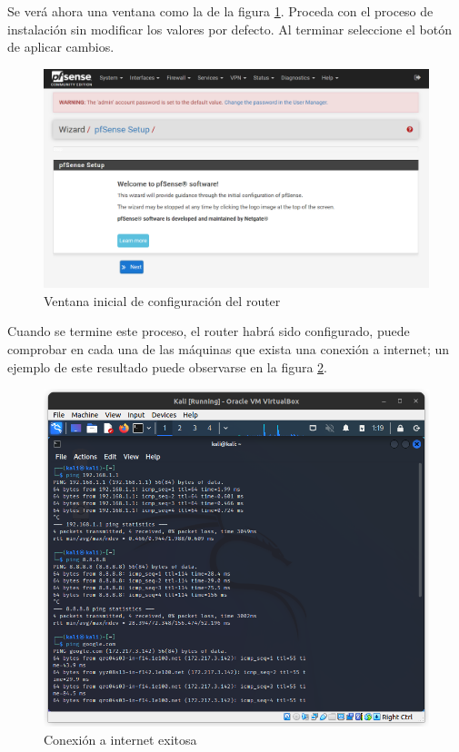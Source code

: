 \documentclass{article}
\begin{document}
            Se verá ahora una ventana como la de la figura \ref{fig:pfsense-config-init}. Proceda con el proceso de instalación sin modificar los valores por defecto. Al terminar seleccione el botón de aplicar cambios.
            \begin{figure}[!htbp]
                \centering
                \includegraphics[scale=0.3]{img/pfsense-config-init.png}
                \caption{Ventana inicial de configuración del router}
                \label{fig:pfsense-config-init}
            \end{figure}

            Cuando se termine este proceso, el router habrá sido configurado, puede comprobar en cada una de las máquinas que exista una conexión a internet; un ejemplo de este resultado puede observarse en la figura \ref{fig:all-internet}.
            \begin{figure}[!htbp]
                \centering
                \includegraphics[scale=0.3]{img/all-internet.png}
                \caption{Conexión a internet exitosa}
                \label{fig:all-internet}
            \end{figure}
\end{document}
